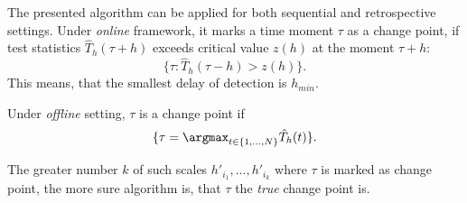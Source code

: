The presented algorithm can be applied for both sequential and retrospective settings. Under \textit{online} framework, it marks a time moment $\tau$ as a change point,  if test statistics $\hat{T}_{h}(\tau + h)$ exceeds critical value $z(h)$ at the moment $\tau + h$:
\[
\{\tau: \hat{T}_{h}(\tau - h) > z(h)\}.
\]
This means, that the smallest delay of detection is $h_{min}$.

Under \textit{offline} setting, $\tau$ is a change point if
\[
\{\tau = \argmax_{t \in \{1,...,N\}} \hat{T}_{h}(t)\}.
\]

The greater number $k$ of such scales $h'_{i_1},...,h'_{i_k}$  where $\tau$ is marked as change point, the more sure algorithm is, that $\tau$ the \textit{true} change point is.













